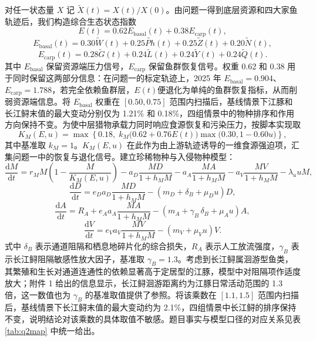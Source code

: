 \documentclass{MMCStyle}
\begin{document}
对任一状态量 $X$ 记 $\widetilde X(t)=X(t)/X(0)$。由问题一得到底层资源和四大家鱼轨迹后，我们构造综合生态状态指数
\begin{equation}
E(t)=0.62E_{\text{basal}}(t)+0.38E_{\text{carp}}(t),
\end{equation}
\begin{equation}
E_{\text{basal}}(t)=0.30\widetilde W(t)+0.25\widetilde{Ph}(t)+0.25\widetilde Z(t)+0.20\widetilde N(t),
\end{equation}
\begin{equation}
E_{\text{carp}}(t)=0.28\widetilde G(t)+0.24\widetilde L(t)+0.24\widetilde Y(t)+0.24\widetilde Q(t).
\end{equation}
其中 $E_{\text{basal}}$ 保留资源端压力信号，$E_{\text{carp}}$ 保留鱼群恢复信号。权重 0.62 和 0.38 用于同时保留这两部分信息：在问题一的标定轨迹上，2025 年 $E_{\text{basal}}=0.904$、$E_{\text{carp}}=1.788$，若完全依赖鱼群层，$E(t)$便退化为单纯的鱼群恢复指标，从而削弱资源端信息。将 $E_{\text{basal}}$ 权重在 $[0.50,0.75]$ 范围内扫描后，基线情景下江豚和长江鲟末值的最大变动分别仅为 1.21\% 和 0.18\%，四组情景中的物种排序和作用方向保持不变。为使中层猎物承载力同时响应食源恢复和污染压力，按脚本实现取
\begin{equation}
K_M(E,u)=\max\left\{0.18,\;k_M\bigl(0.62+0.76E(t)\bigr)\max\bigl(0.30,1-0.60u\bigr)\right\},
\end{equation}
其中基准取 $k_M=1$。$K_M(E,u)$ 在此作为由上游轨迹诱导的一维食源强迫项，汇集问题一中的恢复与退化信号。建立珍稀物种与入侵物种模型\cite{holling1959}：
\begin{equation}
\frac{\mathrm{d}M}{\mathrm{d}t}
=r_M M\left(1-\frac{M}{K_M(E,u)}\right)
-a_D\frac{MD}{1+h_MM}
-a_A\frac{MA}{1+h_MM}
-a_V\frac{MV}{1+h_MM}
-\lambda_u uM,
\end{equation}
\begin{equation}
\frac{\mathrm{d}D}{\mathrm{d}t}
=e_D a_D\frac{MD}{1+h_MM}-(m_D+\delta_B+\mu_Du)D,
\end{equation}
\begin{equation}
\frac{\mathrm{d}A}{\mathrm{d}t}
=R_A+e_A a_A\frac{MA}{1+h_MM}-(m_A+\gamma_B\,\delta_B+\mu_Au)A,
\end{equation}
\begin{equation}
\frac{\mathrm{d}V}{\mathrm{d}t}
=e_V a_V\frac{MV}{1+h_MM}-(m_V+\mu_Vu)V.
\end{equation}
式中 $\delta_B$ 表示通道阻隔和栖息地碎片化的综合损失，$R_A$ 表示人工放流强度，$\gamma_B$ 表示长江鲟阻隔敏感性放大因子，基准取 $\gamma_B=1.3$。考虑到长江鲟属洄游型鱼类，其繁殖和生长对通道连通性的依赖显著高于定居型的江豚，模型中对阻隔项作适度放大；附件 1 给出的信息显示，长江鲟洄游距离约为江豚日常活动范围的 1.3 倍，这一数值也为 $\gamma_B$ 的基准取值提供了参照。将该乘数在 $[1.1,1.5]$ 范围内扫描后，基线情景下长江鲟末值的最大变动约为 2.1\%，四组情景中长江鲟的排序保持不变，说明结论对该乘数的具体取值不敏感。题目事实与模型口径的对应关系见表 \ref{tab:q2map} 中统一给出。
\end{document}
